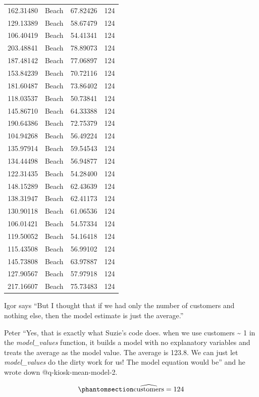 \documentclass[
  12pt,
  letterpaper,
  DIV=11,
  numbers=noendperiod]{scrreprt}
\begin{document}
\begin{longtable}[]{@{}rlrr@{}}
162.31480 & Beach & 67.82426 & 124 \\
129.13389 & Beach & 58.67479 & 124 \\
106.40419 & Beach & 54.41341 & 124 \\
203.48841 & Beach & 78.89073 & 124 \\
187.48142 & Beach & 77.06897 & 124 \\
153.84239 & Beach & 70.72116 & 124 \\
181.60487 & Beach & 73.86402 & 124 \\
118.03537 & Beach & 50.73841 & 124 \\
145.86710 & Beach & 64.33388 & 124 \\
190.64386 & Beach & 72.75379 & 124 \\
104.94268 & Beach & 56.49224 & 124 \\
135.97914 & Beach & 59.54543 & 124 \\
134.44498 & Beach & 56.94877 & 124 \\
122.31435 & Beach & 54.28400 & 124 \\
148.15289 & Beach & 62.43639 & 124 \\
138.31947 & Beach & 62.41173 & 124 \\
130.90118 & Beach & 61.06536 & 124 \\
106.01421 & Beach & 54.57334 & 124 \\
119.50052 & Beach & 54.16418 & 124 \\
115.43508 & Beach & 56.99102 & 124 \\
145.73808 & Beach & 63.97887 & 124 \\
127.90567 & Beach & 57.97918 & 124 \\
217.16607 & Beach & 75.73483 & 124 \\
\end{longtable}

Igor says ``But I thought that if we had only the number of customers
and nothing else, then the model estimate is just the average.''

Peter ``Yes, that is exactly what Suzie's code does. when we use
customers \textasciitilde{} 1 in the \emph{model\_values} function, it
builds a model with no explanatory variables and treats the average as
the model value. The average is 123.8. We can just let
\emph{model\_values} do the dirty work for us! The model equation would
be'' and he wrote down @q-kiosk-mean-model-2.

\begin{equation}\phantomsection\label{eq-kiosk-mean-model-2}{
\widehat{\text{customers}} = 124
}\end{equation}
\end{document}
